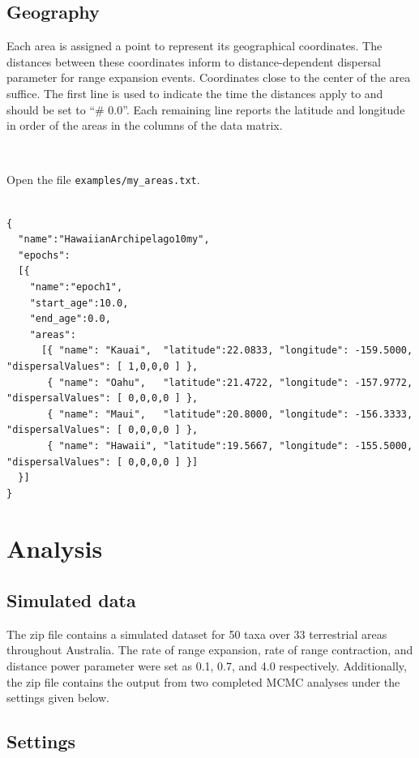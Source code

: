 \documentclass[11pt]{article}
\newcommand{\impmark}{\strut\vadjust{\domark}}
\newcommand{\domark}{%
  \vbox to 0pt{
    \kern-\dp\strutbox
    \smash{\llap{$\rightarrow$\kern1em}}
    \vss
  }%
}
\begin{document}
\subsection{Geography}

Each area is assigned a point to represent its geographical coordinates.
The distances between these coordinates inform to distance-dependent dispersal parameter for range expansion events.
Coordinates close to the center of the area suffice.
The first line is used to indicate the time the distances apply to and should be set to ``\# 0.0''.
Each remaining line reports the latitude and longitude in order of the areas in the columns of the data matrix.

\noindent \\ \impmark Open the file \texttt{examples/my\_areas.txt}.

\begin{framed}
\begin{lstlisting}

{
  "name":"HawaiianArchipelago10my",
  "epochs":
  [{
    "name":"epoch1",
    "start_age":10.0,
    "end_age":0.0,
    "areas":
      [{ "name": "Kauai",  "latitude":22.0833, "longitude": -159.5000, "dispersalValues": [ 1,0,0,0 ] },
       { "name": "Oahu",   "latitude":21.4722, "longitude": -157.9772, "dispersalValues": [ 0,0,0,0 ] },
       { "name": "Maui",   "latitude":20.8000, "longitude": -156.3333, "dispersalValues": [ 0,0,0,0 ] },
       { "name": "Hawaii", "latitude":19.5667, "longitude": -155.5000, "dispersalValues": [ 0,0,0,0 ] }]
  }]
}
\end{lstlisting}
\end{framed}

\section{Analysis}

\subsection{Simulated data}

The zip file contains a simulated dataset for 50 taxa over 33 terrestrial areas throughout Australia.
The rate of range expansion, rate of range contraction, and distance power parameter were set as 0.1, 0.7, and 4.0 respectively.
Additionally, the zip file contains the output from two completed MCMC analyses under the settings given below.

\subsection{Settings}
\end{document}
